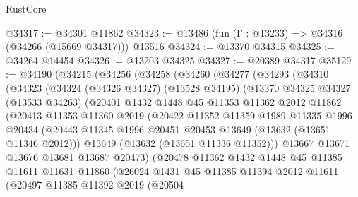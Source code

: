 \begin{lexlean}{RustCore}
\begin{coremodule}
@34317 := @34301 @11862
@34323 := @13486 (fun (Γ : @13233) => @34316 (@34266 (@15669 @34317))) @13516
@34324 := @13370 @34315
@34325 := @34264 @14454
@34326 := @13203 @34325
@34327 := @20389 @34317
@35129 := @34190
    (@34215
      (@34256
        (@34258
          (@34260
            (@34277
              (@34293
                (@34310
                  (@34323
                    (@34324
                      (@34326 @34327)
                      (@13528 @34195)
                      (@13370
                        @34325
                        @34327
                        (@13533 @34263)
                        (@20401
                          @1432
                          @1448
                          @45
                          @11353
                          @11362
                          @2012
                          @11862
                          (@20413
                            @11353
                            @11360
                            @2019
                            (@20422
                              @11352
                              @11359
                              @1989
                              @11335
                              @1996
                              @20434
                              (@20443
                                @11345
                                @1996
                                @20451
                                @20453
                                @13649
                                (@13632 (@13651 @11346 @2012)))
                              @13649
                              (@13632 (@13651 @11336 @11352)))
                            @13667
                            @13671
                            @13676
                            @13681
                            @13687
                            @20473)
                          (@20478
                            @11362
                            @1432
                            @1448
                            @45
                            @11385
                            @11611
                            @11631
                            @11860
                            (@26024
                              @1431
                              @45
                              @11385
                              @11394
                              @2012
                              @11611
                              (@20497
                                @11385
                                @11392
                                @2019
                                (@20504

\end{coremodule}
\end{lexlean}
